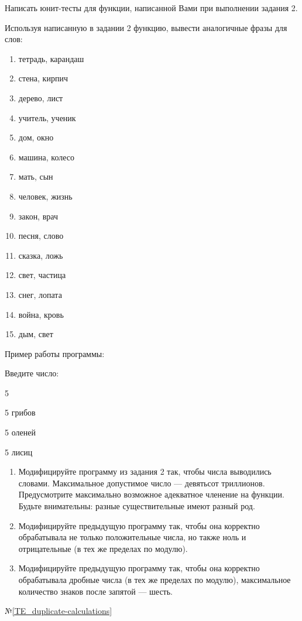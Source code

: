 \labtask

Написать юнит-тесты для функции, написанной Вами при выполнении задания 2.

\labtask

Используя написанную в задании 2 функцию, вывести аналогичные фразы для слов:

\begin{enumerate}

\item 	тетрадь, карандаш

\item 	стена, кирпич

\item 	дерево, лист

\item 	учитель, ученик

\item 	дом, окно

\item 	машина, колесо

\item 	мать, сын

\item 	человек, жизнь

\item 	закон, врач

\item 	песня, слово

\item 	сказка, ложь

\item 	свет, частица

\item 	снег, лопата

\item 	война, кровь

\item 	дым, свет


\end{enumerate}

Пример работы программы:

Введите число:

5

5 грибов

5 оленей

5 лисиц

\reservedtasks

\begin{enumerate}
	\item
		Модифицируйте программу из задания 2 так, чтобы числа выводились словами.
		Максимальное допустимое число --- девятьсот триллионов.
		Предусмотрите максимально возможное адекватное членение на функции.
		Будьте внимательны: разные существительные имеют разный род.
	\item
		Модифицируйте предыдущую программу так, чтобы она корректно обрабатывала не только положительные числа,
		но также ноль и отрицательные (в тех же пределах по модулю).
	\item
		Модифицируйте предыдущую программу так, чтобы она корректно обрабатывала дробные числа (в тех же пределах по модулю),
		максимальное количество знаков после запятой --- шесть.
\end{enumerate}


\typerrors
№\ref{TE_duplicate-calculations}

